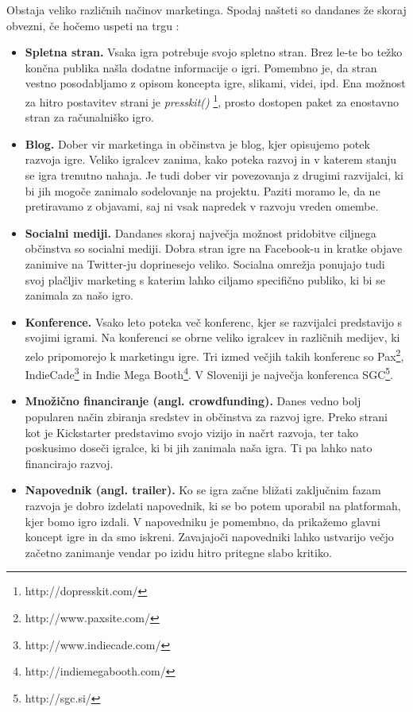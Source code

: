 \documentclass[12pt,a4paper,twoside]{book}
\begin{document}
Obstaja veliko različnih načinov marketinga. Spodaj našteti so dandanes že skoraj obvezni, če hočemo uspeti na trgu \cite{robertMarketing}:
\begin{itemize}
	\item \textbf{Spletna stran.} Vsaka igra potrebuje svojo spletno stran. Brez le-te bo težko končna publika našla dodatne informacije o igri. Pomembno je, da stran vestno posodabljamo z opisom koncepta igre, slikami, videi, ipd. Ena možnost za hitro postavitev strani je \textit{presskit()} \footnote{http://dopresskit.com/}, prosto dostopen paket za enostavno stran za računalniško igro.
	\item \textbf{Blog.} Dober vir marketinga in občinstva je blog, kjer opisujemo potek razvoja igre. Veliko igralcev zanima, kako poteka razvoj in v katerem stanju se igra trenutno nahaja. Je tudi dober vir povezovanja z drugimi razvijalci, ki bi jih mogoče zanimalo sodelovanje na projektu. Paziti moramo le, da ne pretiravamo z objavami, saj ni vsak napredek v razvoju vreden omembe.
	\item \textbf{Socialni mediji.} Dandanes skoraj največja možnost pridobitve ciljnega občinstva so socialni mediji. Dobra stran igre na Facebook-u in kratke objave zanimive na Twitter-ju doprinesejo veliko. Socialna omrežja ponujajo tudi svoj plačljiv marketing s katerim lahko ciljamo specifično publiko, ki bi se zanimala za našo igro.
	\item \textbf{Konference.} Vsako leto poteka več konferenc, kjer se razvijalci predstavijo s svojimi igrami. Na konferenci se obrne veliko igralcev in različnih medijev, ki zelo pripomorejo k marketingu igre. Tri izmed večjih takih konferenc so Pax\footnote{http://www.paxsite.com/}, IndieCade\footnote{http://www.indiecade.com/} in Indie Mega Booth\footnote{http://indiemegabooth.com/}. V Sloveniji je največja konferenca SGC\footnote{http://sgc.si/}.
	\item \textbf{Množično financiranje (angl. crowdfunding).} Danes vedno bolj popularen način zbiranja sredstev in občinstva za razvoj igre. Preko strani kot je Kickstarter predstavimo svojo vizijo in načrt razvoja, ter tako poskusimo doseči igralce, ki bi jih zanimala naša igra. Ti pa lahko nato financirajo razvoj.
	\item \textbf{Napovednik (angl. trailer).} Ko se igra začne bližati zaključnim fazam razvoja je dobro izdelati napovednik, ki se bo potem uporabil na platformah, kjer bomo igro izdali. V napovedniku je pomembno, da prikažemo glavni koncept igre in da smo iskreni. Zavajajoči napovedniki lahko ustvarijo večjo začetno zanimanje vendar po izidu hitro pritegne slabo kritiko.
\end{itemize}
\end{document}
